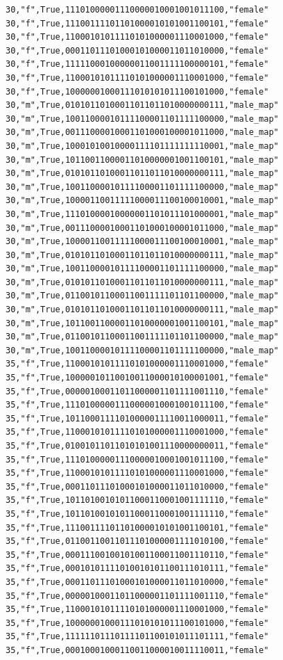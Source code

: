 \documentclass[authoryearcitations]{UoYCSproject}
\begin{document}
\begin{framed}
\begin{verbatim}
30,"f",True,11101000001110000010001001011100,"female"
30,"f",True,11100111101101000010101001100101,"female"
30,"f",True,11000101011110101000001110001000,"female"
30,"f",True,00011011101000101000011011010000,"female"
30,"f",True,11111000100000011001111100000101,"female"
30,"f",True,11000101011110101000001110001000,"female"
30,"f",True,10000001000111010101011100101000,"female"
30,"m",True,01010110100011011011010000000111,"male_map"
30,"m",True,10011000010111100001101111100000,"male_map"
30,"m",True,00111000010001101000100001011000,"male_map"
30,"m",True,10001010010000111101111111110001,"male_map"
30,"m",True,10110011000011010000001001100101,"male_map"
30,"m",True,01010110100011011011010000000111,"male_map"
30,"m",True,10011000010111100001101111100000,"male_map"
30,"m",True,10000110011111000011100100010001,"male_map"
30,"m",True,11101000010000001101011101000001,"male_map"
30,"m",True,00111000010001101000100001011000,"male_map"
30,"m",True,10000110011111000011100100010001,"male_map"
30,"m",True,01010110100011011011010000000111,"male_map"
30,"m",True,10011000010111100001101111100000,"male_map"
30,"m",True,01010110100011011011010000000111,"male_map"
30,"m",True,01100101100011001111101101100000,"male_map"
30,"m",True,01010110100011011011010000000111,"male_map"
30,"m",True,10110011000011010000001001100101,"male_map"
30,"m",True,01100101100011001111101101100000,"male_map"
30,"m",True,10011000010111100001101111100000,"male_map"
35,"f",True,11000101011110101000001110001000,"female"
35,"f",True,10000010110010011000010100001001,"female"
35,"f",True,00000100011011000001101111001110,"female"
35,"f",True,11101000001110000010001001011100,"female"
35,"f",True,10110001111010000011110011000011,"female"
35,"f",True,11000101011110101000001110001000,"female"
35,"f",True,01001011011010101001110000000011,"female"
35,"f",True,11101000001110000010001001011100,"female"
35,"f",True,11000101011110101000001110001000,"female"
35,"f",True,00011011101000101000011011010000,"female"
35,"f",True,10110100101011000110001001111110,"female"
35,"f",True,10110100101011000110001001111110,"female"
35,"f",True,11100111101101000010101001100101,"female"
35,"f",True,01100110011011101000001111010100,"female"
35,"f",True,00011100100101001100011001110110,"female"
35,"f",True,00010101111010010101100111010111,"female"
35,"f",True,00011011101000101000011011010000,"female"
35,"f",True,00000100011011000001101111001110,"female"
35,"f",True,11000101011110101000001110001000,"female"
35,"f",True,10000001000111010101011100101000,"female"
35,"f",True,11111101110111101100101011101111,"female"
35,"f",True,00010001000110011000010011110011,"female"

\end{verbatim}
\end{framed}
\end{document}
